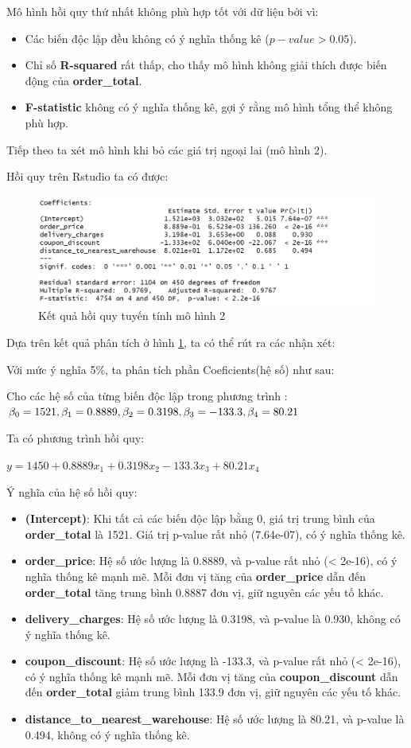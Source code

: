 Mô hình hồi quy thứ nhất không phù hợp tốt với dữ liệu bởi vì:
\begin{itemize}
\item Các biến độc lập đều không có ý nghĩa thống kê ($p-value > 0.05$).
\item Chỉ số \textbf{R-squared} rất thấp, cho thấy mô hình không giải thích được biến động của \textbf{order\_total}.
\item\textbf{F-statistic} không có ý nghĩa thống kê, gợi ý rằng mô hình tổng thể không phù hợp.
\end{itemize}

Tiếp theo ta xét mô hình khi bỏ các giá trị ngoại lai  (mô hình 2).

Hồi quy trên Rstudio ta có được:
\begin{figure}[H]
  \centering
  \includegraphics[width=0.7\linewidth]{graphics/5.5.3.png}
  \caption{Kết quả hồi quy tuyến tính mô hình 2 }
  \label{m3}
\end{figure} 

Dựa trên kết quả phân tích ở hình \ref{m3}, ta có thể rút ra các nhận xét:

Với mức ý nghĩa 5\%, ta phân tích phần Coeficients(hệ số) như sau:

Cho các hệ số của từng biến độc lập trong phương trình : $\beta_0= 1521, \beta_1= 0.8889, \\\beta_2= 0.3198, \beta_3= -133.3, \beta_4= 80.21$ 

Ta có phương trình hồi quy: 

 \hspace{25mm}$y= 1450 + 0.8889x_1 + 0.3198x_2 - 133.3x_3 + 80.21x_4$

Ý nghĩa của hệ số hồi quy:
\begin{itemize}
\item\textbf{(Intercept)}: Khi tất cả các biến độc lập bằng 0, giá trị trung bình của \textbf{order\_total} là 1521. Giá trị p-value rất nhỏ (7.64e-07), có ý nghĩa thống kê.
\item\textbf{order\_price}: Hệ số ước lượng là 0.8889, và p-value rất nhỏ (< 2e-16), có ý nghĩa thống kê mạnh mẽ. Mỗi đơn vị tăng của \textbf{order\_price} dẫn đến \textbf{order\_total} tăng trung bình 0.8887 đơn vị, giữ nguyên các yếu tố khác.
\item\textbf{delivery\_charges}: Hệ số ước lượng là 0.3198, và p-value là 0.930, không có ý nghĩa thống kê.
\item\textbf{coupon\_discount}: Hệ số ước lượng là -133.3, và p-value rất nhỏ (< 2e-16), có ý nghĩa thống kê mạnh mẽ. Mỗi đơn vị tăng của \textbf{coupon\_discount} dẫn đến \textbf{order\_total} giảm trung bình 133.9 đơn vị, giữ nguyên các yếu tố khác.
\item\textbf{distance\_to\_nearest\_warehouse}: Hệ số ước lượng là 80.21, và p-value là 0.494, không có ý nghĩa thống kê.
\end{itemize}

